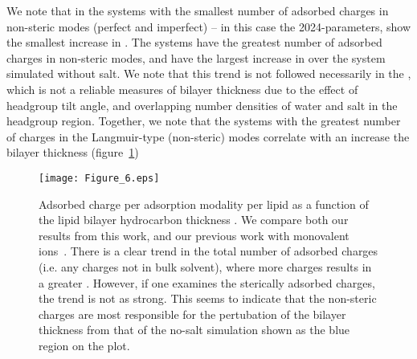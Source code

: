 We note that in the systems with the smallest number of adsorbed charges in non-steric modes (perfect and imperfect) -- in this case the 2024-\mg parameters, show 
the smallest increase in \dc{}. The  systems have the greatest number of adsorbed charges in non-steric modes, 
and have the largest increase in \dc{} over the system simulated without salt. We note that
this trend is not followed necessarily in the \dhh{}, which is not a reliable measures of bilayer thickness due to the effect of headgroup tilt angle, and overlapping number densities of water
and salt in the headgroup region.
Together, we note that the systems with the greatest number of charges in the Langmuir-type (non-steric) modes correlate with an increase the 
bilayer thickness (figure~\ref{figch4:chargeperlipid})
\begin{figure}[H]
    \caption[Adsorbed charge per adsorption modality]{Adsorbed charge per adsorption modality per lipid as a function of the lipid bilayer hydrocarbon thickness \dc{}. We compare both our results from this work, and our previous work with monovalent
        ions~\cite{saunders:2024}. There is a clear trend in the total number of adsorbed
        charges (i.e. any charges not in bulk solvent), where more charges results in a greater \dc{}. However, if one examines the sterically adsorbed charges, the trend is not as strong. This seems to indicate
    that the non-steric charges are most responsible for the pertubation of the bilayer thickness from that of the no-salt simulation shown as the blue region on the plot.}
    \label{figch4:chargeperlipid}
    \texttt{[image: Figure\_6.eps]}
\end{figure}
